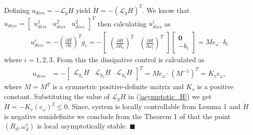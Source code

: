 \documentclass{ifacconf}
\begin{document}
Defining $u_{diss} = - \mathcal{L}_{g}H$ yield $\dot{H} = - (\mathcal{L}_{g}H)^{2}$. We know that $u_{diss}=\begin{bmatrix}
u_{diss}^{1} & u_{diss}^{2} & u_{diss}^{2}
\end{bmatrix}^{T}$ then calculating $u_{diss}^{i}$ as
\begin{align*}
u_{diss}^{i} = - \left(\frac{\partial H}{\partial q}\right)^{T}g_{i} = -\begin{bmatrix}
\left( \frac{\partial H}{\partial R_{s}}\right)^{T} & \left( \frac{\partial H}{\partial \omega_{s}^{s}}\right)^{T}
\end{bmatrix}
\begin{bmatrix}
\textbf{0} \\ 
-b_{i}
\end{bmatrix} = M e_{\omega} \cdot b_{i}
\end{align*}
where $i = {1,2,3}$. From this the dissipative control is calculated as
\begin{align*}
u_{diss} & = - \begin{bmatrix}
\mathcal{L}_{g_{1}}H & \mathcal{L}_{g_{2}}H & \mathcal{L}_{g_{3}}H
\end{bmatrix}^{T} = M e_{\omega} \cdot (M^{-1})^{T}= K_{v} e_{\omega},
\end{align*}
where $M=M^{T}$ is a symmetric positive-definite matrix and $K_{v}$ is a positive constant. Substituting the value of $\mathcal{L}_{g}H$ in (\ref{asymptotic_H}) we get $\dot{H} = - K_{v} (e_{\omega})^{2} \leq 0.$
Since, system is locally controllable from Lemma 1 and $\dot{H}$ is negative semidefinite we conclude from the Theorem 1 of \citep{bullo_stability} that the point $(R_{d}, \omega_{d}^{s})$ is local asymptotically stable. $\blacksquare$\\
\end{document}
